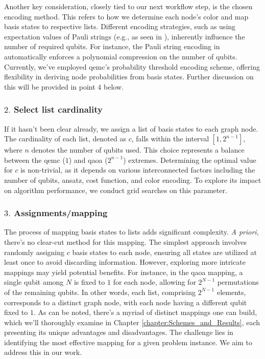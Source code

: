 Another key consideration, closely tied to our next workflow step, is the chosen encoding method. This refers to how we determine each node's color and map basis states to respective lists. Different encoding strategies, such as using expectation values of Pauli strings (e.g., as seen in \cite{sciorilli2024largescale}), inherently influence the number of required qubits. For instance, the Pauli string encoding in \cite{sciorilli2024largescale} automatically enforces a polynomial compression on the number of qubits. Currently, we've employed \acrshort{qemc}'s probability threshold encoding scheme, offering flexibility in deriving node probabilities from basis states. Further discussion on this will be provided in point $4$ below.

\subsubsection*{$2.$ Select list cardinality}
If it hasn't been clear already, we assign a list of basis states to each graph node. The cardinality of each list, denoted as $c$, falls within the interval $\left[1, 2^{n-1}\right]$, where $n$ denotes the number of qubits used. This choice represents a balance between the \acrshort{qemc} ($1$) and \acrshort{qaoa} ($2^{n-1}$) extremes. Determining the optimal value for $c$ is non-trivial, as it depends on various interconnected factors including the number of qubits, ansatz, cost function, and color encoding. To explore its impact on algorithm performance, we conduct grid searches on this parameter.

\subsubsection*{$3.$ Assignments/mapping}
The process of mapping basis states to lists adds significant complexity. \textit{A priori}, there's no clear-cut method for this mapping. The simplest approach involves randomly assigning $c$ basis states to each node, ensuring all states are utilized at least once to avoid discarding information. However, exploring more intricate mappings may yield potential benefits. For instance, in the \acrshort{qaoa} mapping, a single qubit among $N$ is fixed to $1$ for each node, allowing for $2^{N-1}$ permutations of the remaining qubits. In other words, each list, comprising $2^{N-1}$ elements, corresponds to a distinct graph node, with each node having a different qubit fixed to $1$. As can be noted, there's a myriad of distinct mappings one can build, which we'll thoroughly examine in Chapter \ref{chapter:Schemes_and_Results}, each presenting its unique advantages and disadvantages. The challenge lies in identifying the most effective mapping for a given problem instance. We aim to address this in our work.

